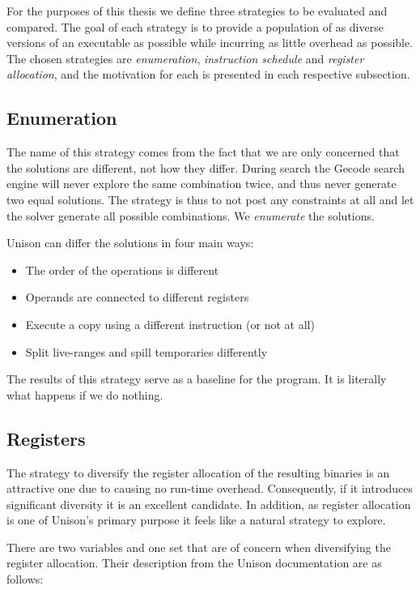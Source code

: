 \label{sec:strategies}

For the purposes of this thesis we define three strategies to be evaluated and compared.
The goal of each strategy is to provide a population of as diverse versions of an
executable as possible while incurring as little overhead as possible. The chosen
strategies are \textit{enumeration}, \textit{instruction schedule} and
\textit{register allocation}, and the motivation for each is presented in each respective
subsection.

\subsection{Enumeration}

The name of this strategy comes from the fact that we are only concerned that the solutions
are different, not how they differ. During search the Gecode search engine will never
explore the same combination twice, and thus never generate two equal solutions. The
strategy is thus to not post any constraints at all and let the solver generate all
possible combinations. We \textit{enumerate} the solutions.

Unison can differ the solutions in four main ways:

\begin{itemize}
	\item The order of the operations is different
	\item Operands are connected to different registers
	\item Execute a copy using a different instruction (or not at all)
	\item Split live-ranges and spill temporaries differently
\end{itemize}

The results of this strategy serve as a baseline for the program. It is literally what
happens if we do nothing.

\subsection{Registers}

The strategy to diversify the register allocation of the resulting binaries is an attractive
one due to causing no run-time overhead. Consequently, if it introduces significant diversity
it is an excellent candidate. In addition, as register allocation is one of Unison's
primary purpose it feels like a natural strategy to explore.

There are two variables and one set that are of concern when diversifying the register
allocation. Their description from the Unison documentation are as follows:

